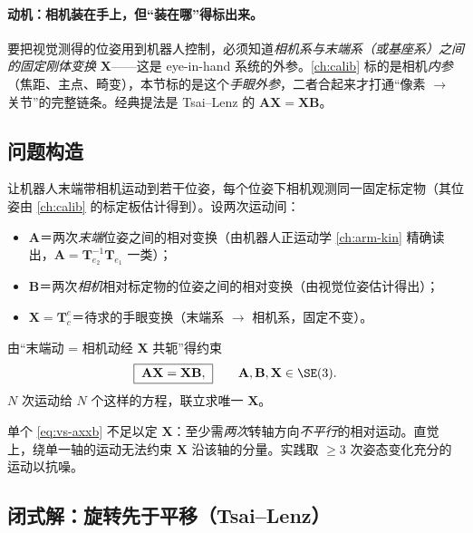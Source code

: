 \paragraph{动机：相机装在手上，但“装在哪”得标出来。}
要把视觉测得的位姿用到机器人控制，必须知道\emph{相机系与末端系（或基座系）之间的固定刚体变换} $\mathbf{X}$——这是 eye-in-hand 系统的外参。\cref{ch:calib} 标的是相机\emph{内参}（焦距、主点、畸变），本节标的是这个\emph{手眼外参}，二者合起来才打通“像素 $\to$ 关节”的完整链条。经典提法是 Tsai--Lenz 的 $\mathbf{A}\mathbf{X}=\mathbf{X}\mathbf{B}$\cite{tsai1989hand}。

\subsection{问题构造}
\label{sec:vs-handeye-formulation}

让机器人末端带相机运动到若干位姿，每个位姿下相机观测同一固定标定物（其位姿由 \cref{ch:calib} 的标定板估计得到）。设两次运动间：
\begin{itemize}
  \item $\mathbf{A}$＝两次\emph{末端}位姿之间的相对变换（由机器人正运动学 \cref{ch:arm-kin} 精确读出，$\mathbf{A}=\mathbf{T}_{e_2}^{-1}\mathbf{T}_{e_1}$ 一类）；
  \item $\mathbf{B}$＝两次\emph{相机}相对标定物的位姿之间的相对变换（由视觉位姿估计得出）；
  \item $\mathbf{X}=\mathbf{T}_c^e$＝待求的手眼变换（末端系 $\to$ 相机系，固定不变）。
\end{itemize}
由“末端动 = 相机动经 $\mathbf{X}$ 共轭”得约束
\begin{equation}
  \boxed{\;\mathbf{A}\mathbf{X}=\mathbf{X}\mathbf{B},\;}
  \qquad \mathbf{A},\mathbf{B},\mathbf{X}\in\SE(3).
  \label{eq:vs-axxb}
\end{equation}
$N$ 次运动给 $N$ 个这样的方程，联立求唯一 $\mathbf{X}$。

\begin{note}[可解性条件]\label{note:vs-axxb-solvability}
单个 \cref{eq:vs-axxb} 不足以定 $\mathbf{X}$：至少需\emph{两次}转轴方向\emph{不平行}的相对运动\cite{tsai1989hand}。直觉上，绕单一轴的运动无法约束 $\mathbf{X}$ 沿该轴的分量。实践取 $\ge3$ 次姿态变化充分的运动以抗噪。
\end{note}

\subsection{闭式解：旋转先于平移（Tsai--Lenz）}
\label{sec:vs-handeye-closed}

